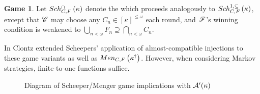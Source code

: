 \documentclass{amsart}
\theoremstyle{plain}
\theoremstyle{definition}
\newtheorem{game}[theorem]{Game}
\theoremstyle{remark}
\theoremstyle{plain}
\theoremstyle{definition}
\theoremstyle{remark}
\begin{document}
  \begin{game}
    Let \(Sch^{\cap}_{C,F}\left({\kappa}\right)\) denote the
     which proceeds analogously
    to \(Sch^{1,\subseteq}_{C,F}\left({\kappa}\right)\), except that \(\mathscr{C}\) may choose any
    \(C_n\in[\kappa]^{\leq\omega}\) each round, and \(\mathscr{F}\)'s winning condition
    is weakened to
    \(\bigcup_{n<\omega}F_n\supseteq\bigcap_{n<\omega}C_n\).
  \end{game}

  In \cite{clontzMengerGamePreprint} Clontz extended Scheepers' application of
  almost-compatible injections to these game variants as well as
  \(Men_{C,F}\left({\kappa^\dagger}\right)\). However, when considering Markov strategies,
  finite-to-one functions suffice.

  \begin{figure}[ht]
\begin{center}
\end{center}
\caption{Diagram of Scheeper/Menger game implications with \(\mathcal{A}'(\kappa)\)}
\label{GamesDiagram2}
\end{figure}


\end{document}
